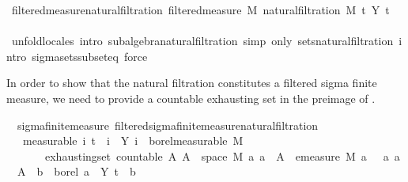 \begin{isabellebody}
\ filtered{\isacharunderscore}{\kern0pt}measure{\isacharunderscore}{\kern0pt}natural{\isacharunderscore}{\kern0pt}filtration{\isacharcolon}{\kern0pt}\ filtered{\isacharunderscore}{\kern0pt}measure\ M\ {\isachardoublequoteopen}natural{\isacharunderscore}{\kern0pt}filtration\ M\ t\ Y{\isachardoublequoteclose}\ t\ \isanewline
%
\isadelimproof
\ \ %
\endisadelimproof
%
\isatagproof
{}\isamarkupfalse%
\ {\isacharparenleft}{\kern0pt}unfold{\isacharunderscore}{\kern0pt}locales{\isacharparenright}{\kern0pt}\ {\isacharparenleft}{\kern0pt}intro\ subalgebra{\isacharunderscore}{\kern0pt}natural{\isacharunderscore}{\kern0pt}filtration{\isacharcomma}{\kern0pt}\ simp\ only{\isacharcolon}{\kern0pt}\ sets{\isacharunderscore}{\kern0pt}natural{\isacharunderscore}{\kern0pt}filtration{\isacharcomma}{\kern0pt}\ intro\ sigma{\isacharunderscore}{\kern0pt}sets{\isacharunderscore}{\kern0pt}subseteq{\isacharcomma}{\kern0pt}\ force{\isacharparenright}{\kern0pt}%
\endisatagproof
{\isafoldproof}%
%
\isadelimproof
\ \isanewline
%
\endisadelimproof
\isanewline
{}\isamarkupfalse%
%
\begin{isamarkuptext}%
In order to show that the natural filtration constitutes a filtered sigma finite measure, we need to provide a countable exhausting set in the preimage of .%
\end{isamarkuptext}\isamarkuptrue%
\isamarkupfalse%
\ {\isacharparenleft}{\kern0pt}\ sigma{\isacharunderscore}{\kern0pt}finite{\isacharunderscore}{\kern0pt}measure{\isacharparenright}{\kern0pt}\ filtered{\isacharunderscore}{\kern0pt}sigma{\isacharunderscore}{\kern0pt}finite{\isacharunderscore}{\kern0pt}measure{\isacharunderscore}{\kern0pt}natural{\isacharunderscore}{\kern0pt}filtration{\isacharcolon}{\kern0pt}\isanewline
\ \ \ {\isacharbrackleft}{\kern0pt}measurable{\isacharbrackright}{\kern0pt}{\isacharcolon}{\kern0pt}\ {\isachardoublequoteopen}{\isasymAnd}i{\isachardot}{\kern0pt}\ t\ {\isasymle}\ i\ {\isasymLongrightarrow}\ Y\ i\ {\isasymin}\ borel{\isacharunderscore}{\kern0pt}measurable\ M{\isachardoublequoteclose}\isanewline
\ \ \ \ \ \ \ exhausting{\isacharunderscore}{\kern0pt}set{\isacharcolon}{\kern0pt}\ {\isachardoublequoteopen}countable\ A{\isachardoublequoteclose}\ {\isachardoublequoteopen}{\isacharparenleft}{\kern0pt}{\isasymUnion}A{\isacharparenright}{\kern0pt}\ {\isacharequal}{\kern0pt}\ space\ M{\isachardoublequoteclose}\ {\isachardoublequoteopen}{\isasymAnd}a{\isachardot}{\kern0pt}\ a\ {\isasymin}\ A\ {\isasymLongrightarrow}\ emeasure\ M\ a\ {\isasymnoteq}\ {\isasyminfinity}{\isachardoublequoteclose}\ {\isachardoublequoteopen}{\isasymAnd}a{\isachardot}{\kern0pt}\ a\ {\isasymin}\ A\ {\isasymLongrightarrow}\ {\isasymexists}b\ {\isasymin}\ borel{\isachardot}{\kern0pt}\ a\ {\isacharequal}{\kern0pt}\ Y\ t\ {\isacharminus}{\kern0pt}{\isacharbackquote}{\kern0pt}\ b{\isachardoublequoteclose}\isanewline

\end{isabellebody}
